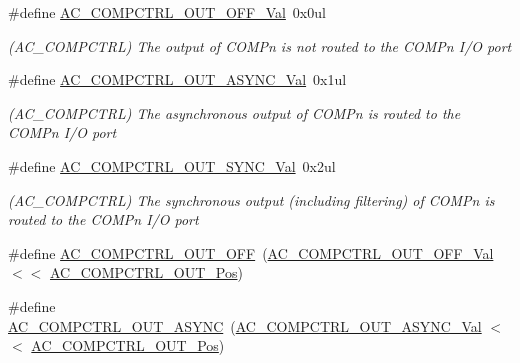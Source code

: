 \begin{DoxyCompactItemize}
\item 
\#define \mbox{\hyperlink{group___s_a_m_d21___a_c_gaf53c9e960f0c4a3279b6068973c65cc7}{A\+C\+\_\+\+C\+O\+M\+P\+C\+T\+R\+L\+\_\+\+O\+U\+T\+\_\+\+O\+F\+F\+\_\+\+Val}}~0x0ul
\begin{DoxyCompactList}\small\item\em (A\+C\+\_\+\+C\+O\+M\+P\+C\+T\+RL) The output of C\+O\+M\+Pn is not routed to the C\+O\+M\+Pn I/O port \end{DoxyCompactList}\item 
\#define \mbox{\hyperlink{group___s_a_m_d21___a_c_ga45c6b70bb8a6f53dc173f631c9ac7fca}{A\+C\+\_\+\+C\+O\+M\+P\+C\+T\+R\+L\+\_\+\+O\+U\+T\+\_\+\+A\+S\+Y\+N\+C\+\_\+\+Val}}~0x1ul
\begin{DoxyCompactList}\small\item\em (A\+C\+\_\+\+C\+O\+M\+P\+C\+T\+RL) The asynchronous output of C\+O\+M\+Pn is routed to the C\+O\+M\+Pn I/O port \end{DoxyCompactList}\item 
\#define \mbox{\hyperlink{group___s_a_m_d21___a_c_ga85ea47206d4f4b7d3b3a59244ae48705}{A\+C\+\_\+\+C\+O\+M\+P\+C\+T\+R\+L\+\_\+\+O\+U\+T\+\_\+\+S\+Y\+N\+C\+\_\+\+Val}}~0x2ul
\begin{DoxyCompactList}\small\item\em (A\+C\+\_\+\+C\+O\+M\+P\+C\+T\+RL) The synchronous output (including filtering) of C\+O\+M\+Pn is routed to the C\+O\+M\+Pn I/O port \end{DoxyCompactList}\item 
\#define \mbox{\hyperlink{group___s_a_m_d21___a_c_ga7b4eaee3d8d3b3eb5d7cb31840d59940}{A\+C\+\_\+\+C\+O\+M\+P\+C\+T\+R\+L\+\_\+\+O\+U\+T\+\_\+\+O\+FF}}~(\mbox{\hyperlink{group___s_a_m_d21___a_c_gaf53c9e960f0c4a3279b6068973c65cc7}{A\+C\+\_\+\+C\+O\+M\+P\+C\+T\+R\+L\+\_\+\+O\+U\+T\+\_\+\+O\+F\+F\+\_\+\+Val}}       $<$$<$ \mbox{\hyperlink{group___s_a_m_d21___a_c_ga6dfe864873a0eadaba8922ecf4b25ed1}{A\+C\+\_\+\+C\+O\+M\+P\+C\+T\+R\+L\+\_\+\+O\+U\+T\+\_\+\+Pos}})
\item 
\#define \mbox{\hyperlink{group___s_a_m_d21___a_c_ga808418dba5229a06f6db32f13032cbb0}{A\+C\+\_\+\+C\+O\+M\+P\+C\+T\+R\+L\+\_\+\+O\+U\+T\+\_\+\+A\+S\+Y\+NC}}~(\mbox{\hyperlink{group___s_a_m_d21___a_c_ga45c6b70bb8a6f53dc173f631c9ac7fca}{A\+C\+\_\+\+C\+O\+M\+P\+C\+T\+R\+L\+\_\+\+O\+U\+T\+\_\+\+A\+S\+Y\+N\+C\+\_\+\+Val}}     $<$$<$ \mbox{\hyperlink{group___s_a_m_d21___a_c_ga6dfe864873a0eadaba8922ecf4b25ed1}{A\+C\+\_\+\+C\+O\+M\+P\+C\+T\+R\+L\+\_\+\+O\+U\+T\+\_\+\+Pos}})
\item 

\end{DoxyCompactItemize}

